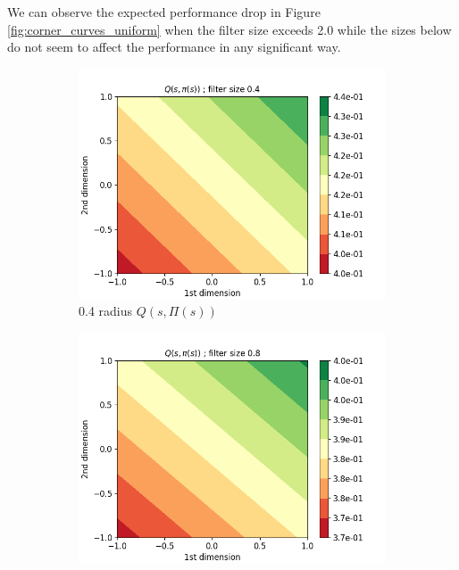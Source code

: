 \documentclass{article}
\begin{document}
We can observe the expected performance drop in Figure \ref{fig:corner_curves_uniform} when the filter size exceeds 2.0 while the sizes below do not seem to affect the performance in any significant way.

\begin{figure}[H]
  \centering
   \begin{subfigure}[b]{0.3\linewidth}
    \includegraphics[width=\linewidth]{Study_2/2.3/visualizations/Q_contour_0_4.png}
      \caption{0.4 radius $Q(s, \Pi(s))$}
  \end{subfigure}
   \begin{subfigure}[b]{0.3\linewidth}
    \includegraphics[width=\linewidth]{Study_2/2.3/visualizations/Q_contour_0_8.png}

\end{subfigure}
\end{figure}
\end{document}

